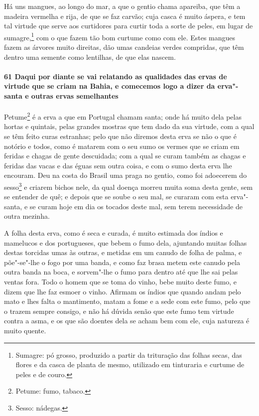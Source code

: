 \begin{linenumbers}
Há uns mangues, ao longo do mar, a que o gentio chama apareiba, que têm a madeira vermelha
e rija, de que se faz carvão; cuja casca é muito áspera, e tem tal virtude que serve aos
curtidores para curtir toda a sorte de peles, em lugar de sumagre,\footnote{ Sumagre: pó
grosso, produzido a partir da trituração das folhas secas, das flores e da casca de planta
de mesmo, utilizado em tinturaria e curtume de peles e de couro.} com o que fazem tão bom
curtume como com ele. Estes mangues fazem as árvores
muito direitas, dão umas candeias verdes compridas, que têm
dentro uma semente como lentilhas, de que elas nascem.

\paragraph{61 Daqui por diante se vai relatando as qualidades das ervas de virtude que se
criam na Bahia, e comecemos logo a dizer da erva"-santa e outras ervas semelhantes}\quad
Petume\footnote{ Petume: fumo, tabaco.} é a erva a que em Portugal chamam santa; onde há
muito dela pelas hortas e quintais, pelas grandes mostras que tem dado da sua virtude, com
a qual se têm feito curas estranhas; pelo que não diremos desta erva se não o que é
notório e todos, como é matarem com o seu sumo os vermes que se criam em feridas e chagas
de gente descuidada; com a qual se curam também as chagas e feridas das vacas e das éguas
sem outra coisa, e com o sumo desta erva lhe encouram. Deu na costa do Brasil uma praga no
gentio, como foi adoecerem do sesso\footnote{ Sesso: nádegas.} e criarem bichos
nele, da qual doença morreu muita soma desta gente, sem se entender de quê; e depois que
se soube o seu mal, se curaram com esta erva"-santa, e se curam hoje em dia os tocados
deste mal, sem terem necessidade de outra mezinha.

A folha desta erva, como é seca e curada, é muito estimada dos índios e mamelucos e dos
portugueses, que bebem o fumo dela, ajuntando muitas folhas destas torcidas umas às
outras, e metidas em um canudo de folha de palma, e põe"-se"-lhe o fogo por uma banda, e
como faz brasa metem este canudo pela outra banda na boca, e sorvem"-lhe o fumo para dentro
até que lhe sai pelas ventas fora. Todo o homem que se toma do vinho, bebe muito deste
fumo, e dizem que lhe faz esmoer o vinho. Afirmam os índios que quando andam pelo mato e
lhes falta o mantimento, matam a fome e a sede com este fumo, pelo que o trazem sempre
consigo, e não há dúvida senão que este fumo tem virtude contra a asma, e os que são
doentes dela se acham bem com ele, cuja natureza é muito quente.


\end{linenumbers}
